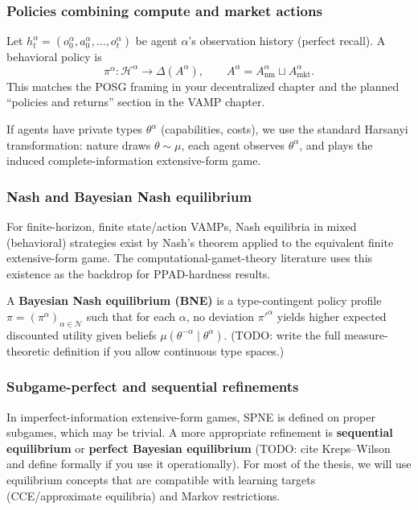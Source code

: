 \subsubsection{Policies combining compute and market actions}

Let \(h_t^\alpha=(o_0^\alpha,a_0^\alpha,\dots,o_t^\alpha)\) be agent \(\alpha\)'s observation history (perfect recall). A behavioral policy is
\[
\pi^\alpha:\mathcal{H}^\alpha\to\Delta(A^\alpha),
\qquad
A^\alpha=A_{\mathrm{nm}}^\alpha\sqcup A_{\mathrm{mkt}}^\alpha.
\]
This matches the POSG framing in your decentralized chapter and the planned ``policies and returns'' section in the VAMP chapter.

If agents have private types \(\theta^\alpha\) (capabilities, costs), we use the standard Harsanyi transformation: nature draws \(\theta\sim\mu\), each agent observes \(\theta^\alpha\), and plays the induced complete-information extensive-form game.

\subsubsection{Nash and Bayesian Nash equilibrium}

For finite-horizon, finite state/action VAMPs, Nash equilibria in mixed (behavioral) strategies exist by Nash's theorem applied to the equivalent finite extensive-form game. The computational-gamet-theory literature uses this existence as the backdrop for PPAD-hardness results.

A \textbf{Bayesian Nash equilibrium (BNE)} is a type-contingent policy profile \(\pi=(\pi^\alpha)_{\alpha\in\mathcal{N}}\) such that for each \(\alpha\), no deviation \(\pi'^\alpha\) yields higher expected discounted utility given beliefs \(\mu(\theta^{-\alpha}\mid \theta^\alpha)\). (TODO: write the full measure-theoretic definition if you allow continuous type spaces.)

\subsubsection{Subgame-perfect and sequential refinements}

In imperfect-information extensive-form games, SPNE is defined on proper subgames, which may be trivial. A more appropriate refinement is \textbf{sequential equilibrium} or \textbf{perfect Bayesian equilibrium} (TODO: cite Kreps--Wilson and define formally if you use it operationally). For most of the thesis, we will use equilibrium concepts that are compatible with learning targets (CCE/approximate equilibria) and Markov restrictions.

